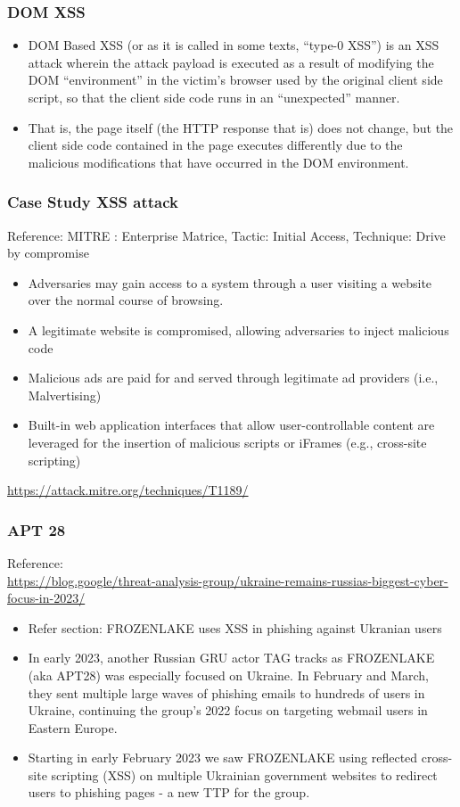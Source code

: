 \documentclass[13pt, aspectratio=169]{beamer}
\begin{document}
\begin{frame}
\frametitle{DOM XSS}

\begin{itemize}
	\item DOM Based XSS (or as it is called in some texts, “type-0 XSS”) is an XSS attack wherein the attack payload is executed as a result of modifying the DOM “environment” in the victim’s browser used by the original client side script, so that the client side code runs in an “unexpected” manner. 
	\item That is, the page itself (the HTTP response that is) does not change, but the client side code contained in the page executes differently due to the malicious modifications that have occurred in the DOM environment.
\end{itemize}
	
\end{frame}

\begin{frame}
	\frametitle{Case Study XSS attack}
Reference: MITRE : Enterprise Matrice, Tactic: Initial Access, Technique: Drive by compromise
	\begin{itemize}
		\item Adversaries may gain access to a system through a user visiting a website over the normal course of browsing. 		
		\item A legitimate website is compromised, allowing adversaries to inject malicious code
		\item Malicious ads are paid for and served through legitimate ad providers (i.e., Malvertising)
		\item Built-in web application interfaces that allow user-controllable content are leveraged for the insertion of malicious scripts or iFrames (e.g., cross-site scripting)
	\end{itemize}
\url{https://attack.mitre.org/techniques/T1189/}

\end{frame}

\begin{frame}
	\frametitle{APT 28}
Reference:\\ \small \url{https://blog.google/threat-analysis-group/ukraine-remains-russias-biggest-cyber-focus-in-2023/}

\begin{itemize}
	\item Refer section: FROZENLAKE uses XSS in phishing against Ukranian users
	\item In early 2023, another Russian GRU actor TAG tracks as FROZENLAKE (aka APT28) was especially focused on Ukraine. In February and March, they sent multiple large waves of phishing emails to hundreds of users in Ukraine, continuing the group’s 2022 focus on targeting webmail users in Eastern Europe.
	
	\item Starting in early February 2023 we saw FROZENLAKE using reflected cross-site scripting (XSS) on multiple Ukrainian government websites to redirect users to phishing pages - a new TTP for the group. 
	\end{itemize}

\end{frame}
\end{document}
